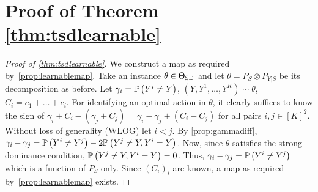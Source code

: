\section*{Proof of  Theorem \ref{thm:tsdlearnable}}
\begin{proof}[Proof of \cref{thm:tsdlearnable}]
	We construct a map as required by~\cref{prop:learnablemap}.
	Take an instance $\theta \in \Theta_{\mathrm{SD}}$ and let $\theta = P_S \otimes P_{Y|S}$ be its decomposition as before.
	Let $\gamma_i = \mathbb{P}\left(Y^i \ne Y\right)$, $(Y,Y^1,\dots,Y^K)\sim \theta$, $C_i = c_1+\dots+c_i$.
	For identifying an optimal action in $\theta$, it clearly suffices
	to know the sign of $\gamma_i + C_i - (\gamma_j +C_j) = \gamma_i-\gamma_j + (C_i-C_j)$ for all pairs $i,j\in [K]^2$.
	Without loss of generality (WLOG) let $i<j$. By \cref{prop:gammadiff},
	$\gamma_i - \gamma_j = \mathbb{P}\left( Y^i \ne Y^j \right) -2 \mathbb{P}\left( Y^j\ne Y, Y^i = Y \right)$.
	Now, since $\theta$ satisfies the strong dominance condition, $ \mathbb{P}\left( Y^j\ne Y, Y^i = Y \right) = 0$.
	Thus, $\gamma_i - \gamma_j = \mathbb{P}\left( Y^i \ne Y^j \right)$
	which is a function of $P_S$ only.
	Since $(C_i)_i$ are known, a map as required by~\cref{prop:learnablemap} exists.
\end{proof}

